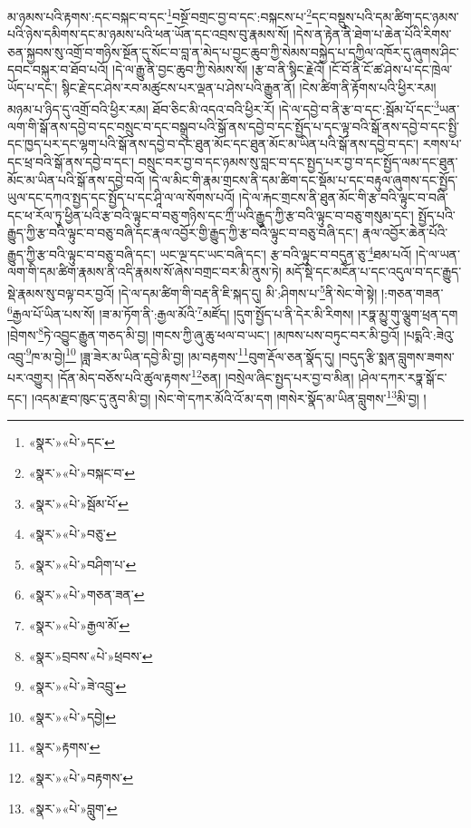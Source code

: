 མ་ཉམས་པའི་རྟགས་:དང་བསྐང་བ་དང་\footnote{«སྣར་»«པེ་»དང་}བསྔོ་བགྲང་བྱ་བ་དང་:བསྐངས་པ་\footnote{«སྣར་»«པེ་»བསྐང་བ་}དང་བསྡུས་པའི་དམ་ཚིག་དང་ཉམས་པའི་ཉེས་དམིགས་དང་མ་ཉམས་པའི་ཕན་ཡོན་དང་འབྲས་བུ་རྣམས་སོ། །དེས་ན་རྟེན་ནི་ཐེག་པ་ཆེན་པོའི་རིགས་ཅན་སྐྱབས་སུ་འགྲོ་བ་གཉིས་སྔོན་དུ་སོང་བ་བླ་ན་མེད་པ་བྱང་ཆུབ་ཀྱི་སེམས་བསྐྱེད་པ་དཀྱིལ་འཁོར་དུ་ཞུགས་ཤིང་དབང་བསྐུར་བ་ཐོབ་པའོ། །དེ་ལ་རྒྱུ་ནི་བྱང་ཆུབ་ཀྱི་སེམས་སོ། །རྩ་བ་ནི་སྙིང་རྗེའོ། །ངོ་བོ་ནི་ངོ་ཚ་ཤེས་པ་དང་ཁྲེལ་ཡོད་པ་དང་། སྙིང་རྗེ་དང་ཤེས་རབ་མཚུངས་པར་ལྡན་པ་ཤེས་པའི་རྒྱུན་ནོ། །ངེས་ཚིག་ནི་རྟོགས་པའི་ཕྱིར་རམ། མཉམ་པ་ཉིད་དུ་འགྲོ་བའི་ཕྱིར་རམ། ཐོབ་ཅིང་མི་འདའ་བའི་ཕྱིར་རོ། །དེ་ལ་དབྱེ་བ་ནི་རྩ་བ་དང་:སྦོམ་པོ་དང་\footnote{«སྣར་»«པེ་»སྦོམ་པོ་}ཡན་ལག་གི་སྒོ་ནས་དབྱེ་བ་དང་བསྲུང་བ་དང་བསྒྲུབ་པའི་སྒོ་ནས་དབྱེ་བ་དང་སྤྱོད་པ་དང་ལྟ་བའི་སྒོ་ནས་དབྱེ་བ་དང་སྤྱི་དང་ཁྱད་པར་དང་ལྷག་པའི་སྒོ་ནས་དབྱེ་བ་དང་ཐུན་མོང་དང་ཐུན་མོང་མ་ཡིན་པའི་སྒོ་ནས་དབྱེ་བ་དང་། རགས་པ་དང་ཕྲ་བའི་སྒོ་ནས་དབྱེ་བ་དང་། བསྲུང་བར་བྱ་བ་དང་ཉམས་སུ་བླང་བ་དང་སྤྱད་པར་བྱ་བ་དང་སྤྱོད་ལམ་དང་ཐུན་མོང་མ་ཡིན་པའི་སྒོ་ནས་དབྱེ་བའོ། །དེ་ལ་མིང་གི་རྣམ་གྲངས་ནི་དམ་ཚིག་དང་སྡོམ་པ་དང་བརྟུལ་ཞུགས་དང་སྤྱོད་ཡུལ་དང་དཀའ་སྤྱད་དང་སྤྱོད་པ་དང་ཤཱི་ལ་ལ་སོགས་པའོ། །དེ་ལ་རྐང་གྲངས་ནི་ཐུན་མོང་གི་རྩ་བའི་ལྟུང་བ་བཞི་དང་ཕ་རོལ་ཏུ་ཕྱིན་པའི་རྩ་བའི་ལྟུང་བ་བཅུ་གཉིས་དང་ཀྲྀ་ཡའི་རྒྱུད་ཀྱི་རྩ་བའི་ལྟུང་བ་བཅུ་གསུམ་དང་། སྤྱོད་པའི་རྒྱུད་ཀྱི་རྩ་བའི་ལྟུང་བ་བཅུ་བཞི་དང་རྣལ་འབྱོར་གྱི་རྒྱུད་ཀྱི་རྩ་བའི་ལྟུང་བ་བཅུ་བཞི་དང་། རྣལ་འབྱོར་ཆེན་པོའི་རྒྱུད་ཀྱི་རྩ་བའི་ལྟུང་བ་བཅུ་བཞི་དང་། ཡང་ལྔ་དང་ཡང་བཞི་དང་། རྩ་བའི་ལྟུང་བ་བདུན་ཅུ་\footnote{«སྣར་»«པེ་»བཅུ་}ཐམ་པའོ། །དེ་ལ་ཡན་ལག་གི་དམ་ཚིག་རྣམས་ནི་འདི་རྣམས་སོ་ཞེས་བགྲང་བར་མི་ནུས་ཏེ། མདོ་སྡེ་དང་མངོན་པ་དང་འདུལ་བ་དང་རྒྱུད་སྡེ་རྣམས་སུ་བལྟ་བར་བྱའོ། །དེ་ལ་དམ་ཚིག་གི་བརྡ་ནི་ཇི་སྐད་དུ། མི་:ཤིགས་པ་\footnote{«སྣར་»«པེ་»བཤིག་པ་}ནི་སེང་གེ་སྟེ། །:གཅན་གཟན་\footnote{«སྣར་»«པེ་»གཅན་ཟན་}རྒྱལ་པོ་ཡིན་པས་སོ། །ཟ་མ་ཏོག་ནི་:རྒྱལ་མོའི་\footnote{«སྣར་»«པེ་»རྒྱལ་མོ་}མཛོད། །དུག་སྤྱོད་པ་ནི་དེར་མི་རིགས། །རཏྣ་མྱུ་གུ་ལྕུག་ཕྲན་དག །བྲེགས་\footnote{«སྣར་»བྲབས་«པེ་»ཕྲབས་}ཏེ་འབྱུང་རྒྱུན་གཅད་མི་བྱ། །གངས་ཀྱི་ཞུ་ཆུ་ཕལ་བ་ཡང་། །མཁས་པས་བཏུང་བར་མི་བྱའོ། །པདྨའི་:ཟེའུ་འབྲུ་\footnote{«སྣར་»«པེ་»ཟེ་འབྲུ་}ཁ་མ་བྱེ།\footnote{«སྣར་»«པེ་»དབྱེ།} །ཟླ་ཟེར་མ་ཡིན་དབྱེ་མི་བྱ། །མ་བརྟགས་\footnote{«སྣར་»རྟགས་}བུག་རྡོལ་ཅན་སྣོད་དུ། །བདུད་རྩི་སྨན་བླུགས་ཟགས་པར་འགྱུར། །དོན་མེད་བཅོས་པའི་ཚུལ་རྟགས་\footnote{«སྣར་»«པེ་»བརྟགས་}ཅན། །བསྲེལ་ཞིང་སྤྱད་པར་བྱ་བ་མིན། །ཤེལ་དཀར་རཏྣ་སྒོ་ང་དང་། །འདམ་རྫབ་ཁུང་དུ་ནུབ་མི་བྱ། །སེང་གེ་དཀར་མོའི་འོ་མ་དག །གསེར་སྣོད་མ་ཡིན་བླུགས་\footnote{«སྣར་»«པེ་»བླུག་}མི་བྱ། །
